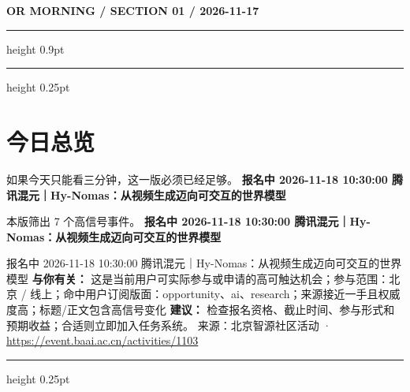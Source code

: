 \documentclass[10.5pt]{ctexart}
\begin{document}
{\small\bfseries OR MORNING / SECTION 01 / 2026-11-17}
\vspace{2mm}
\hrule height 0.9pt
\vspace{1.5mm}
\hrule height 0.25pt
\vspace{4mm}
\section*{今日总览}
{\color{ormuted} 如果今天只能看三分钟，这一版必须已经足够。}
\vspace{2mm}
{\fontsize{25}{29}\selectfont\bfseries 报名中 2026-11-18 10:30:00 腾讯混元｜Hy-Nomas：从视频生成迈向可交互的世界模型}\par
\vspace{2mm}
{\large 本版筛出 7 个高信号事件。}
\vspace{3mm}
{\Large\bfseries 报名中 2026-11-18 10:30:00 腾讯混元｜Hy-Nomas：从视频生成迈向可交互的世界模型}\par
报名中 2026-11-18 10:30:00 腾讯混元｜Hy-Nomas：从视频生成迈向可交互的世界模型
\textbf{与你有关：} 这是当前用户可实际参与或申请的高可触达机会；参与范围：北京 / 线上；命中用户订阅版面：opportunity、ai、research；来源接近一手且权威度高；标题/正文包含高信号变化
\textbf{建议：} 检查报名资格、截止时间、参与形式和预期收益；合适则立即加入任务系统。
{\footnotesize\color{ormuted} 来源：北京智源社区活动 · \url{https://event.baai.ac.cn/activities/1103}}
\vspace{3mm}
\hrule height 0.25pt
\vspace{3mm}
\end{document}

